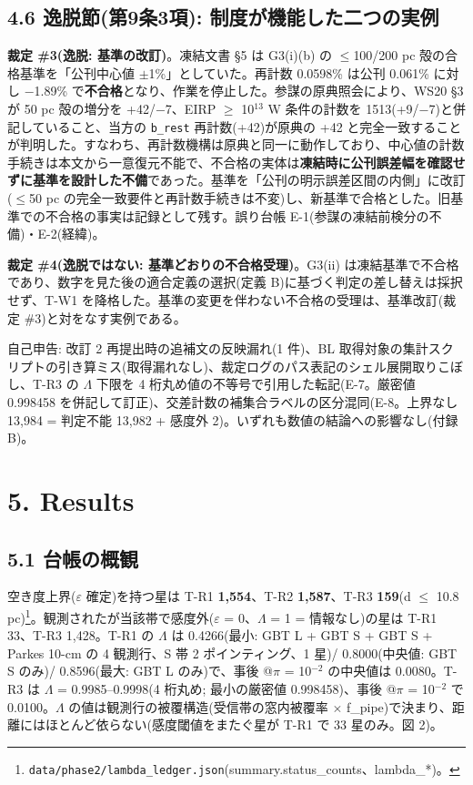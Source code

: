 \documentclass[11pt]{article}
\begin{document}
\subsection*{4.6 逸脱節(第9条3項): 制度が機能した二つの実例}
\noindent \textbf{裁定 \#3(逸脱: 基準の改訂)}。凍結文書 \S{}5 は G3(i)(b) の \(\leq\)100/200 pc 殻の合格基準を「公刊中心値 \(\pm\)1\%」としていた。再計数 0.0598\% は公刊 0.061\% に対し \(-\)1.89\% で\textbf{不合格}となり、作業を停止した。参謀の原典照会により、WS20 \S{}3 が 50 pc 殻の増分を +42/\(-\)7、EIRP \(\geq\) 10\(^{13}\) W 条件の計数を 1513(+9/\(-\)7)と併記していること、当方の \texttt{b\_rest} 再計数(+42)が原典の +42 と完全一致することが判明した。すなわち、再計数機構は原典と同一に動作しており、中心値の計数手続きは本文から一意復元不能で、不合格の実体は\textbf{凍結時に公刊誤差幅を確認せずに基準を設計した不備}であった。基準を「公刊の明示誤差区間の内側」に改訂(\(\leq\)50 pc の完全一致要件と再計数手続きは不変)し、新基準で合格とした。旧基準での不合格の事実は記録として残す。誤り台帳 E-1(参謀の凍結前検分の不備)・E-2(経緯)。\par\smallskip
\noindent \textbf{裁定 \#4(逸脱ではない: 基準どおりの不合格受理)}。G3(ii) は凍結基準で不合格であり、数字を見た後の適合定義の選択(定義 B)に基づく判定の差し替えは採択せず、T-W1 を降格した。基準の変更を伴わない不合格の受理は、基準改訂(裁定 \#3)と対をなす実例である。\par\smallskip
\noindent 自己申告: 改訂 2 再提出時の追補文の反映漏れ(1 件)、BL 取得対象の集計スクリプトの引き算ミス(取得漏れなし)、裁定ログのパス表記のシェル展開取りこぼし、T-R3 の \(\Lambda\) 下限を 4 桁丸め値の不等号で引用した転記(E-7。厳密値 0.998458 を併記して訂正)、交差計数の補集合ラベルの区分混同(E-8。上界なし 13,984 = 判定不能 13,982 + 感度外 2)。いずれも数値の結論への影響なし(付録 B)。\par\smallskip

\section*{5. Results}

\subsection*{5.1 台帳の概観}
\noindent 空き度上界(\(\varepsilon\) 確定)を持つ星は T-R1 \textbf{1,554}、T-R2 \textbf{1,587}、T-R3 \textbf{159}(d \(\leq\) 10.8 pc)\footnote{\texttt{data/phase2/lambda\_ledger.json}(summary.status\_counts、lambda\_*)。}。観測されたが当該帯で感度外(\(\varepsilon\) = 0、\(\Lambda\) = 1 = 情報なし)の星は T-R1 33、T-R3 1,428。T-R1 の \(\Lambda\) は 0.4266(最小: GBT L + GBT S + GBT S + Parkes 10-cm の 4 観測行、S 帯 2 ポインティング、1 星)/ 0.8000(中央値: GBT S のみ)/ 0.8596(最大: GBT L のみ)で、事後 @\(\pi\) = 10\(^{-2}\) の中央値は 0.0080。T-R3 は \(\Lambda\) = 0.9985–0.9998(4 桁丸め; 最小の厳密値 0.998458)、事後 @\(\pi\) = 10\(^{-2}\) で 0.0100。\(\Lambda\) の値は観測行の被覆構造(受信帯の窓内被覆率 \(\times\) f\_pipe)で決まり、距離にはほとんど依らない(感度閾値をまたぐ星が T-R1 で 33 星のみ。図 2)。\par\smallskip
\end{document}
